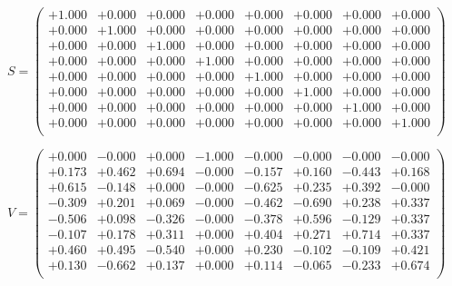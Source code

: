 \documentclass[9pt]{article}
\theoremstyle{plain}
\theoremstyle{definition}
\theoremstyle{remark}
\numberwithin{equation}{section}
\begin{document}
$S = \left(
\begin{array}{
cccccccc}
+1.000 & +0.000 & +0.000 & +0.000 & +0.000 & +0.000 & +0.000 & +0.000 \\
+0.000 & +1.000 & +0.000 & +0.000 & +0.000 & +0.000 & +0.000 & +0.000 \\
+0.000 & +0.000 & +1.000 & +0.000 & +0.000 & +0.000 & +0.000 & +0.000 \\
+0.000 & +0.000 & +0.000 & +1.000 & +0.000 & +0.000 & +0.000 & +0.000 \\
+0.000 & +0.000 & +0.000 & +0.000 & +1.000 & +0.000 & +0.000 & +0.000 \\
+0.000 & +0.000 & +0.000 & +0.000 & +0.000 & +1.000 & +0.000 & +0.000 \\
+0.000 & +0.000 & +0.000 & +0.000 & +0.000 & +0.000 & +1.000 & +0.000 \\
+0.000 & +0.000 & +0.000 & +0.000 & +0.000 & +0.000 & +0.000 & +1.000 \\
\end{array}
\right)$ \newline 

$V = \left(
\begin{array}{
cccccccc}
+0.000 & -0.000 & +0.000 & -1.000 & -0.000 & -0.000 & -0.000 & -0.000 \\
+0.173 & +0.462 & +0.694 & -0.000 & -0.157 & +0.160 & -0.443 & +0.168 \\
+0.615 & -0.148 & +0.000 & -0.000 & -0.625 & +0.235 & +0.392 & -0.000 \\
-0.309 & +0.201 & +0.069 & -0.000 & -0.462 & -0.690 & +0.238 & +0.337 \\
-0.506 & +0.098 & -0.326 & -0.000 & -0.378 & +0.596 & -0.129 & +0.337 \\
-0.107 & +0.178 & +0.311 & +0.000 & +0.404 & +0.271 & +0.714 & +0.337 \\
+0.460 & +0.495 & -0.540 & +0.000 & +0.230 & -0.102 & -0.109 & +0.421 \\
+0.130 & -0.662 & +0.137 & +0.000 & +0.114 & -0.065 & -0.233 & +0.674 \\
\end{array}
\right)$ \newline 
\end{document}
